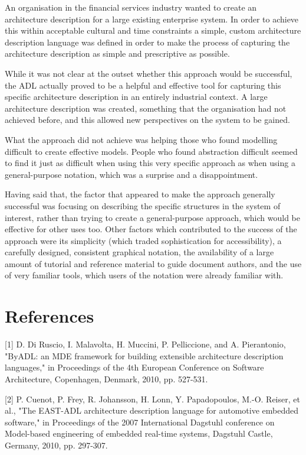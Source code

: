 \begin{itemise}
  An organisation in the financial services industry wanted to create an architecture description for a large existing enterprise system.  In order to achieve this within acceptable cultural and time constraints a simple, custom architecture description language was defined in order to make the process of capturing the architecture description as simple and prescriptive as possible.

  While it was not clear at the outset whether this approach would be successful, the ADL actually proved to be a helpful and effective tool for capturing this specific architecture description in an entirely industrial context.  A large architecture description was created, something that the organisation had not achieved before, and this allowed new perspectives on the system to be gained.

  What the approach did not achieve was helping those who found modelling difficult to create effective models.  People who found abstraction difficult seemed to find it just as difficult when using this very specific approach as when using a general-purpose notation, which was a surprise and a disappointment.

  Having said that, the factor that appeared to make the approach generally successful was focusing on describing the specific structures in the system of interest, rather than trying to create a general-purpose approach, which would be effective for other uses too.  Other factors which contributed to the success of the approach were its simplicity (which traded sophistication for accessibility), a carefully designed, consistent graphical notation, the availability of a large amount of tutorial and reference material to guide document authors, and the use of very familiar tools, which users of the notation were already familiar with.

\section{References}

[1]	D. Di Ruscio, I. Malavolta, H. Muccini, P. Pelliccione, and A. Pierantonio, "ByADL: an MDE framework for building extensible architecture description languages," in Proceedings of the 4th European Conference on Software Architecture, Copenhagen, Denmark, 2010, pp. 527-531.

[2]	P. Cuenot, P. Frey, R. Johansson, H. Lonn, Y. Papadopoulos, M.-O. Reiser, et al., "The EAST-ADL architecture description language for automotive embedded software," in Proceedings of the 2007 International Dagstuhl conference on Model-based engineering of embedded real-time systems, Dagstuhl Castle, Germany, 2010, pp. 297-307.


\end{itemise}
